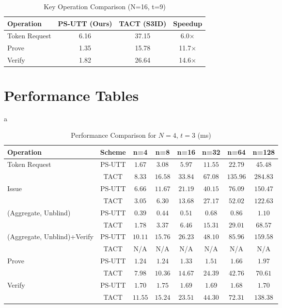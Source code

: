 \begin{table}[h]
\centering
\caption{Key Operation Comparison (N=16, t=9)}
\begin{tabular}{lccc}
\toprule
\textbf{Operation} & \textbf{PS-UTT (Ours)} & \textbf{TACT (S3ID)} & \textbf{Speedup} \\
\midrule
Token Request & 6.16 & 37.15 & 6.0× \\
Prove & 1.35 & 15.78 & 11.7× \\
Verify & 1.82 & 26.64 & 14.6× \\
\bottomrule
\end{tabular}
\end{table}



\section{Performance Tables}a
\label{app:perf-tables}

\begin{table}[h]
\centering
\caption{Performance Comparison for $N=4$, $t=3$ (ms)}
\label{tab:perf-comp-4-3}
\begin{tabular}{lccccccc}
\toprule
\textbf{Operation} & \textbf{Scheme} & \textbf{n=4} & \textbf{n=8} & \textbf{n=16} & \textbf{n=32} & \textbf{n=64} & \textbf{n=128} \\
\midrule
Token Request & PS-UTT & $1.67$ & $3.08$ & $5.97$ & $11.55$ & $22.79$ & $45.48$ \\
& TACT & $8.33$ & $16.58$ & $33.84$ & $67.08$ & $135.96$ & $284.83$ \\
\midrule
Issue & PS-UTT & $6.66$ & $11.67$ & $21.19$ & $40.15$ & $76.09$ & $150.47$ \\
& TACT & $3.05$ & $6.30$ & $13.68$ & $27.17$ & $52.02$ & $122.63$ \\
\midrule
(Aggregate, Unblind) & PS-UTT & $0.39$ & $0.44$ & $0.51$ & $0.68$ & $0.86$ & $1.10$ \\
& TACT & $1.78$ & $3.37$ & $6.46$ & $15.31$ & $29.01$ & $68.57$ \\
\midrule
(Aggregate, Unblind)+Verify & PS-UTT & $10.11$ & $15.76$ & $26.23$ & $48.10$ & $85.96$ & $159.58$ \\
& TACT & N/A & N/A & N/A & N/A & N/A & N/A \\
\midrule
Prove & PS-UTT & $1.24$ & $1.24$ & $1.33$ & $1.51$ & $1.66$ & $1.97$ \\
& TACT & $7.98$ & $10.36$ & $14.67$ & $24.39$ & $42.76$ & $70.61$ \\
\midrule
Verify & PS-UTT & $1.70$ & $1.75$ & $1.69$ & $1.69$ & $1.68$ & $1.70$ \\
& TACT & $11.55$ & $15.24$ & $23.51$ & $44.30$ & $72.31$ & $138.38$ \\
\bottomrule
\end{tabular}
\end{table}